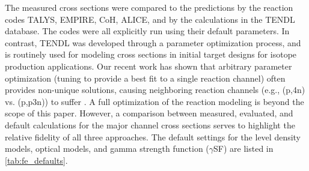 The measured cross sections were compared to the predictions by the reaction codes TALYS, EMPIRE, CoH, ALICE, and by the calculations in the TENDL database.
The codes were all explicitly run using their default parameters.
In contrast, TENDL was developed through a parameter optimization process, and is routinely used for modeling cross sections in initial target designs for isotope production applications.  
Our recent work has shown that  arbitrary parameter optimization (tuning to provide a best fit to a single reaction channel)  often provides non-unique solutions, causing neighboring reaction channels (e.g., (p,4n) vs. (p,p3n)) to suffer \cite{fox2020investigating}.
A full optimization of the reaction modeling is beyond the scope of this paper.  
However, a  comparison between measured, evaluated, and default calculations for the major channel cross sections serves to highlight the relative fidelity of all three approaches.  
%
The default settings for the level density models, optical models, and gamma strength function ($\gamma$SF) are listed in  \autoref{tab:fe_defaults}.
